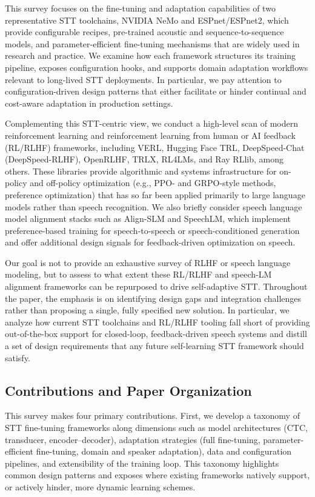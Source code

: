 \documentclass[conference]{IEEEtran}
\begin{document}
This survey focuses on the fine-tuning and adaptation capabilities of two representative STT toolchains, NVIDIA NeMo and ESPnet/ESPnet2, which provide configurable recipes, pre-trained acoustic and sequence-to-sequence models, and parameter-efficient fine-tuning mechanisms that are widely used in research and practice. We examine how each framework structures its training pipeline, exposes configuration hooks, and supports domain adaptation workflows relevant to long-lived STT deployments. In particular, we pay attention to configuration-driven design patterns that either facilitate or hinder continual and cost-aware adaptation in production settings.

Complementing this STT-centric view, we conduct a high-level scan of modern reinforcement learning and reinforcement learning from human or AI feedback (RL/RLHF) frameworks, including VERL, Hugging Face TRL, DeepSpeed-Chat (DeepSpeed-RLHF), OpenRLHF, TRLX, RL4LMs, and Ray RLlib, among others. These libraries provide algorithmic and systems infrastructure for on-policy and off-policy optimization (e.g., PPO- and GRPO-style methods, preference optimization) that has so far been applied primarily to large language models rather than speech recognition. We also briefly consider speech language model alignment stacks such as Align-SLM and SpeechLM, which implement preference-based training for speech-to-speech or speech-conditioned generation and offer additional design signals for feedback-driven optimization on speech.

Our goal is not to provide an exhaustive survey of RLHF or speech language modeling, but to assess to what extent these RL/RLHF and speech-LM alignment frameworks can be repurposed to drive self-adaptive STT. Throughout the paper, the emphasis is on identifying design gaps and integration challenges rather than proposing a single, fully specified new solution. In particular, we analyze how current STT toolchains and RL/RLHF tooling fall short of providing out-of-the-box support for closed-loop, feedback-driven speech systems and distill a set of design requirements that any future self-learning STT framework should satisfy.

\subsection{Contributions and Paper Organization}

This survey makes four primary contributions. First, we develop a taxonomy of STT fine-tuning frameworks along dimensions such as model architectures (CTC, transducer, encoder–decoder), adaptation strategies (full fine-tuning, parameter-efficient fine-tuning, domain and speaker adaptation), data and configuration pipelines, and extensibility of the training loop. This taxonomy highlights common design patterns and exposes where existing frameworks natively support, or actively hinder, more dynamic learning schemes.
\end{document}
